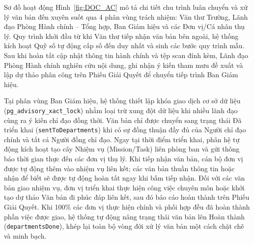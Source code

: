 Sơ đồ hoạt động Hình~\ref{fig:DOC_AC} mô tả chi tiết chu trình luân chuyển và xử lý văn bản đến xuyên suốt qua 4 phân vùng trách nhiệm: Văn thư Trường, Lãnh đạo Phòng Hành chính -- Tổng hợp, Ban Giám hiệu và các Đơn vị/Cá nhân thụ lý. Quy trình khởi đầu từ khi Văn thư tiếp nhận văn bản bên ngoài, hệ thống kích hoạt Quỹ số tự động cấp số đến duy nhất và sinh các bước quy trình mẫu. Sau khi hoàn tất cập nhật thông tin hành chính và tệp scan đính kèm, Lãnh đạo Phòng Hành chính nghiên cứu nội dung, ghi nhận ý kiến tham mưu đề xuất và lập dự thảo phân công trên Phiếu Giải Quyết để chuyển tiếp trình Ban Giám hiệu.

Tại phân vùng Ban Giám hiệu, hệ thống thiết lập khóa giao dịch cơ sở dữ liệu (\texttt{pg\_advisory\_xact\_lock}) nhằm loại trừ xung đột dữ liệu khi nhiều lãnh đạo cùng ra ý kiến chỉ đạo đồng thời. Văn bản chỉ được chuyển sang trạng thái Đã triển khai (\texttt{sentToDepartments}) khi có sự đồng thuận đầy đủ của Người chỉ đạo chính và tất cả Người đồng chỉ đạo. Ngay tại thời điểm triển khai, phân hệ tự động kích hoạt tạo cây Nhiệm vụ (Mission/Task) liên phòng ban và gửi thông báo thời gian thực đến các đơn vị thụ lý. Khi tiếp nhận văn bản, cán bộ đơn vị được tự động thêm vào nhiệm vụ liên kết; các văn bản thuần thông tin hoặc nhận để biết sẽ được tự động hoàn tất ngay khi bấm tiếp nhận. Đối với các văn bản giao nhiệm vụ, đơn vị triển khai thực hiện công việc chuyên môn hoặc khởi tạo dự thảo Văn bản đi phúc đáp liên kết, sau đó báo cáo hoàn thành trên Phiếu Giải Quyết. Khi 100\% các đơn vị thực hiện chính và phối hợp đều đã hoàn thành phần việc được giao, hệ thống tự động nâng trạng thái văn bản lên Hoàn thành (\texttt{departmentsDone}), khép lại toàn bộ vòng đời xử lý văn bản một cách chặt chẽ và minh bạch.
